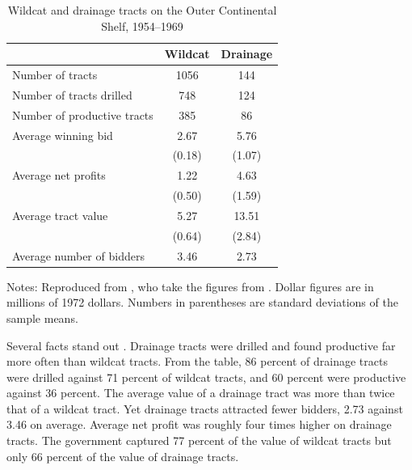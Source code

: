 \begin{table}[htbp]
\centering
\caption{Wildcat and drainage tracts on the Outer Continental Shelf, 1954--1969}\label{tab:14-hp-table1}
\begin{tabular}{@{}lcc@{}}
\toprule
 & Wildcat & Drainage \\
\midrule
Number of tracts & 1056 & 144 \\
Number of tracts drilled & 748 & 124 \\
Number of productive tracts & 385 & 86 \\
Average winning bid & 2.67 & 5.76 \\
 & (0.18) & (1.07) \\
Average net profits & 1.22 & 4.63 \\
 & (0.50) & (1.59) \\
Average tract value & 5.27 & 13.51 \\
 & (0.64) & (2.84) \\
Average number of bidders & 3.46 & 2.73 \\
\bottomrule
\end{tabular}

\smallskip
\begin{minipage}{0.8\textwidth}
\footnotesize Notes: Reproduced from \citet[Table~1]{HendricksPorter1988}, who take the figures from
\citet{HendricksPorterBoudreau1987}. Dollar figures are in millions of 1972 dollars. Numbers in parentheses
are standard deviations of the sample means.
\end{minipage}
\end{table}

Several facts stand out \citep[p.~866]{HendricksPorter1988}. Drainage tracts were drilled and found
productive far more often than wildcat tracts. From the table, 86 percent of drainage tracts were drilled
against 71 percent of wildcat tracts, and 60 percent were productive against 36 percent. The average value
of a drainage tract was more than twice that of a wildcat tract. Yet drainage tracts attracted fewer
bidders, 2.73 against 3.46 on average. Average net profit was roughly four times higher on drainage tracts.
The government captured 77 percent of the value of wildcat tracts but only 66 percent of the value of
drainage tracts.

